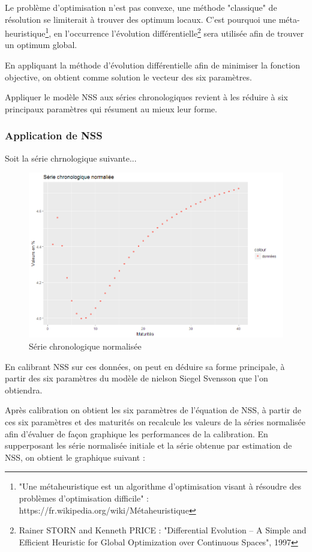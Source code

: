Le problème d'optimisation n'est pas convexe, une méthode "classique" de résolution se limiterait à trouver des optimum locaux. C'est pourquoi une méta-heuristique\footnote{"Une métaheuristique est un algorithme d’optimisation visant à résoudre des problèmes d’optimisation difficile" : https://fr.wikipedia.org/wiki/Métaheuristique}, en l’occurrence l'évolution différentielle\footnote{Rainer STORN and Kenneth PRICE : "Differential Evolution – A Simple and Efficient Heuristic for Global Optimization over Continuous Spaces", 1997} sera utilisée afin de trouver un optimum global.

En appliquant la méthode d'évolution différentielle afin de minimiser la fonction objective, on obtient comme solution le vecteur des six paramètres.

Appliquer le modèle NSS aux séries chronologiques revient à les réduire à six principaux paramètres qui résument au mieux leur forme.
\subsubsection{Application de NSS}

Soit la série chrnologique suivante...

\begin{figure}[H]
\centering
\caption{Série chronologique normalisée}
   \includegraphics[scale=0.7]{img/data.png}
\end{figure}

En calibrant NSS sur ces données, on peut en déduire sa forme principale, à partir des six paramètres du modèle de nielson Siegel Svensson que l'on obtiendra.

Après calibration on obtient les six paramètres de l'équation de NSS, à partir de ces six paramètres et des maturités on recalcule les valeurs de la séries normalisée afin d'évaluer de façon graphique les performances de la calibration. En supperposant les série normalisée initiale et la série obtenue par estimation de NSS, on obtient le graphique suivant :

